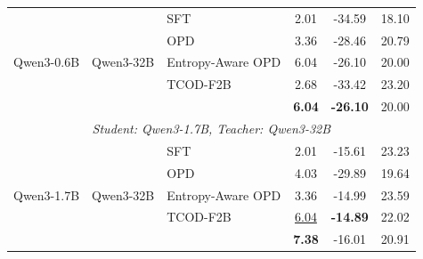 \begin{table}[t]
{\begin{tabular}{lllccc}
\midrule
\multirow{5}{*}{Qwen3-0.6B} & \multirow{5}{*}{Qwen3-32B} & SFT & 2.01 & -34.59 & 18.10 \\
 & & OPD & 3.36 & -28.46 & 20.79 \\
 & & Entropy-Aware OPD & 6.04 & -26.10 & 20.00 \\
 & & TCOD-F2B & 2.68 & -33.42 & 23.20 \\
 & & \ours{} & \textbf{6.04} & \textbf{-26.10} & 20.00 \\
\midrule
\multicolumn{6}{c}{\textit{Student: Qwen3-1.7B, Teacher: Qwen3-32B}} \\
\midrule
\multirow{5}{*}{Qwen3-1.7B} & \multirow{5}{*}{Qwen3-32B} & SFT & 2.01 & -15.61 & 23.23 \\
 & & OPD & 4.03 & -29.89 & 19.64 \\
 & & Entropy-Aware OPD & 3.36 & -14.99 & 23.59 \\
 & & TCOD-F2B & \underline{6.04} & \textbf{-14.89} & 22.02 \\
 & & \ours{} & \textbf{7.38} & -16.01 & 20.91 \\
\bottomrule
\end{tabular}%
}
\end{table}
%
